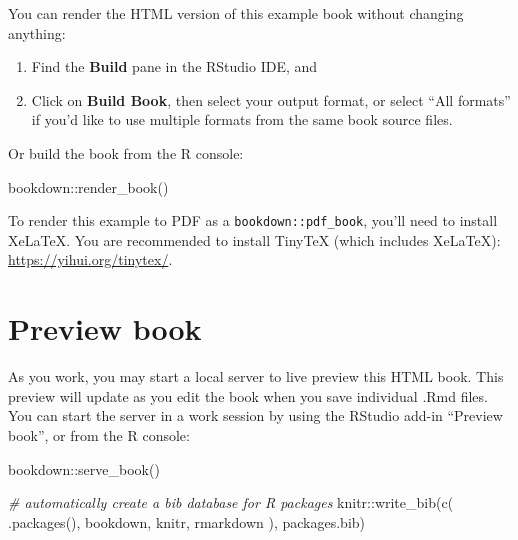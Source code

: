 \documentclass[
]{book}
\newenvironment{Shaded}{\begin{snugshade}}{\end{snugshade}}
\newcommand{\CommentTok}[1]{\textcolor[rgb]{0.56,0.35,0.01}{\textit{#1}}}
\newcommand{\FunctionTok}[1]{\textcolor[rgb]{0.00,0.00,0.00}{#1}}
\newcommand{\NormalTok}[1]{#1}
\newcommand{\SpecialCharTok}[1]{\textcolor[rgb]{0.00,0.00,0.00}{#1}}
\newcommand{\StringTok}[1]{\textcolor[rgb]{0.31,0.60,0.02}{#1}}
\theoremstyle{definition}
\theoremstyle{definition}
\theoremstyle{definition}
\theoremstyle{definition}
\theoremstyle{remark}
\begin{document}
You can render the HTML version of this example book without changing anything:

\begin{enumerate}
\def\labelenumi{\arabic{enumi}.}
\item
  Find the \textbf{Build} pane in the RStudio IDE, and
\item
  Click on \textbf{Build Book}, then select your output format, or select ``All formats'' if you'd like to use multiple formats from the same book source files.
\end{enumerate}

Or build the book from the R console:

\begin{Shaded}
\begin{Highlighting}[]
\NormalTok{bookdown}\SpecialCharTok{::}\FunctionTok{render\_book}\NormalTok{()}
\end{Highlighting}
\end{Shaded}

To render this example to PDF as a \texttt{bookdown::pdf\_book}, you'll need to install XeLaTeX. You are recommended to install TinyTeX (which includes XeLaTeX): \url{https://yihui.org/tinytex/}.

\hypertarget{preview-book}{%
\section{Preview book}\label{preview-book}}

As you work, you may start a local server to live preview this HTML book. This preview will update as you edit the book when you save individual .Rmd files. You can start the server in a work session by using the RStudio add-in ``Preview book'', or from the R console:

\begin{Shaded}
\begin{Highlighting}[]
\NormalTok{bookdown}\SpecialCharTok{::}\FunctionTok{serve\_book}\NormalTok{()}
\end{Highlighting}
\end{Shaded}

\begin{Shaded}
\begin{Highlighting}[]
\CommentTok{\# automatically create a bib database for R packages}
\NormalTok{knitr}\SpecialCharTok{::}\FunctionTok{write\_bib}\NormalTok{(}\FunctionTok{c}\NormalTok{(}
  \FunctionTok{.packages}\NormalTok{(), }\StringTok{\textquotesingle{}bookdown\textquotesingle{}}\NormalTok{, }\StringTok{\textquotesingle{}knitr\textquotesingle{}}\NormalTok{, }\StringTok{\textquotesingle{}rmarkdown\textquotesingle{}}
\NormalTok{), }\StringTok{\textquotesingle{}packages.bib\textquotesingle{}}\NormalTok{)}
\end{Highlighting}
\end{Shaded}
\end{document}
